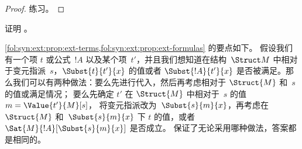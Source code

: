 \documentclass[../../../include/open-logic-section]{subfiles}
\begin{document}
\begin{proof}
练习。
\end{proof}

\begin{prob}
证明 。
\end{prob}

\begin{explain}
  \cref{fol:syn:ext:prop:ext-terms,fol:syn:ext:prop:ext-formulas} 的要点如下。
  假设我们有一个项 $t$ 或公式~$!A$ 以及某个项~$t'$，并且我们想知道在结构~$\Struct M$
  中相对于变元指派~$s$，$\Subst{t}{t'}{x}$ 的值或者 $\Subst{!A}{t'}{x}$
  是否被满足。那么我们可以有两种做法：要么先进行代入，然后再考虑相对于 $\Struct{M}$ 和~$s$ 的值或满足情况；
  要么先确定 $t'$ 在 $\Struct{M}$ 中相对于~$s$ 的值 $m = \Value{t'}{M}[s]$，
  将变元指派改为~$\Subst{s}{m}{x}$，再考虑在 $\Struct{M}$ 和~$\Subst{s}{m}{x}$ 下 $t$
  的值，或者 $\Sat{M}{!A}[\Subst{s}{m}{x}]$ 是否成立。
  保证了无论采用哪种做法，答案都是相同的。
\end{explain}
\end{document}
